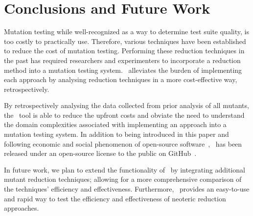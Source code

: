 \section{Conclusions and Future Work}

Mutation testing while well-recognized as a way to determine test suite quality, is too costly
to practically use. Therefore, various techniques have been established to reduce the cost
of mutation testing. Performing these reduction techniques in the past has required researchers
and experimenters to incorporate a reduction method into a mutation testing system. \mr~alleviates
the burden of implementing each approach by analysing reduction techniques in a more cost-effective
way, retrospectively.

By retrospectively analysing the data collected from prior analysis of all
mutants, the \mr~tool is able to reduce the upfront costs and obviate the need to understand the
domain complexities associated with implementing an approach into a mutation testing system.
In addition to being introduced in this paper and following economic and social phenomenon of
open-source software~\cite{hippel2003open}, \mr~has been released under an open-source license
to the public on GitHub~\cite{github}.

In future work, we plan to extend the functionality of \mr~by integrating additional
mutant reduction techniques; allowing for a more comprehensive comparison of the techniques'
efficiency and effectiveness. Furthermore, \mr~provides an easy-to-use and rapid
way to test the efficiency and effectiveness of neoteric reduction approaches.

